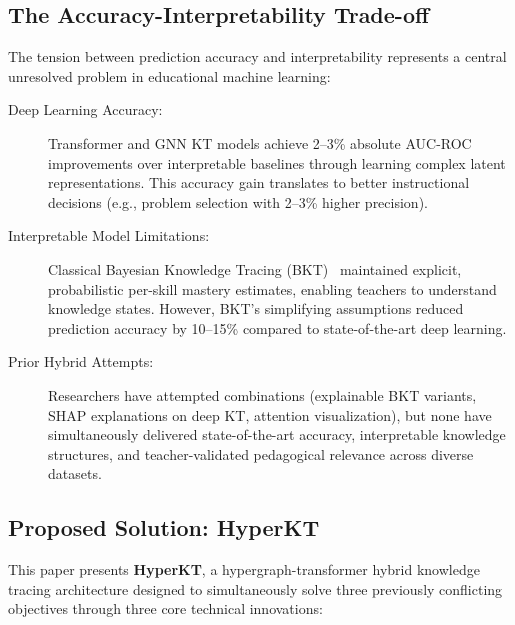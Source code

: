 \documentclass[10pt,twocolumn]{article}
\begin{document}
\subsection{The Accuracy-Interpretability Trade-off}

The tension between prediction accuracy and interpretability represents a central unresolved problem in educational machine learning:

\begin{description}
  \item[Deep Learning Accuracy:] Transformer and GNN KT models achieve 2--3\% absolute AUC-ROC improvements over interpretable baselines through learning complex latent representations. This accuracy gain translates to better instructional decisions (e.g., problem selection with 2--3\% higher precision).
  
  \item[Interpretable Model Limitations:] Classical Bayesian Knowledge Tracing (BKT)~\cite{corbett1994} maintained explicit, probabilistic per-skill mastery estimates, enabling teachers to understand knowledge states. However, BKT's simplifying assumptions reduced prediction accuracy by 10--15\% compared to state-of-the-art deep learning.
  
  \item[Prior Hybrid Attempts:] Researchers have attempted combinations (explainable BKT variants, SHAP explanations on deep KT, attention visualization), but none have simultaneously delivered state-of-the-art accuracy, interpretable knowledge structures, and teacher-validated pedagogical relevance across diverse datasets.
\end{description}

\subsection{Proposed Solution: HyperKT}

This paper presents \textbf{HyperKT}, a hypergraph-transformer hybrid knowledge tracing architecture designed to simultaneously solve three previously conflicting objectives through three core technical innovations:
\end{document}
